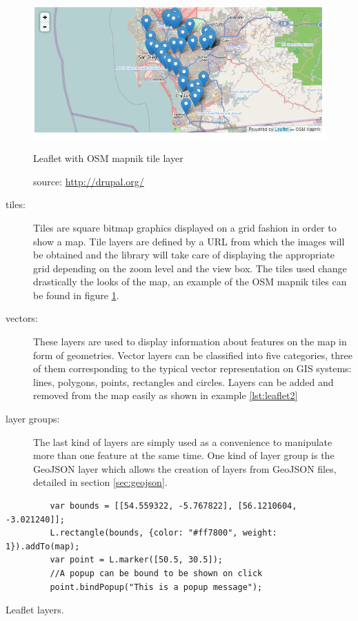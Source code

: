 \begin{figure}
  \centering
  \includegraphics[width=.8\textwidth]{fig/leaflet-osmmapnik}
  \caption{Leaflet with OSM mapnik tile layer}
  \caption*{source: \url{http://drupal.org/}}
  \label{fig:leaflet1}
\end{figure} 

\begin{description}
\item[tiles:] Tiles are square bitmap graphics displayed on a grid fashion in order to show a map. Tile layers are defined by a URL from which the images will be obtained and the library will take care of displaying the appropriate grid depending on the zoom level and the view box. The tiles used change drastically the looks of the map, an example of the OSM mapnik tiles can be found in figure \ref{fig:leaflet1}.

\item[vectors:] These layers are used to display information about features on the map in form of geometries. Vector layers can be classified into five categories, three of them corresponding to the typical vector representation on GIS systems: lines, polygons, points, rectangles and circles. Layers can be added and removed from the map easily as shown in example \ref{lst:leaflet2}

\item[layer groups:] The last kind of layers are simply used as a convenience to manipulate more than one feature at the same time. One kind of layer group is the GeoJSON layer which allows the creation of layers from GeoJSON files, detailed in section \ref{sec:geojson}.

\end{description}

\begin{listing}\centering
  \begin{minipage}{.7\textwidth}
    \begin{verbatim}
	     var bounds = [[54.559322, -5.767822], [56.1210604, -3.021240]];
	     L.rectangle(bounds, {color: "#ff7800", weight: 1}).addTo(map);
	     var point = L.marker([50.5, 30.5]);
	     //A popup can be bound to be shown on click
	     point.bindPopup("This is a popup message");
    \end{verbatim}
  \end{minipage}
  \caption{Leaflet layers.}\label{lst:leaflet2}
\end{listing}

